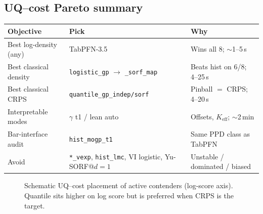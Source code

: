 \documentclass[11pt,a4paper]{article}
\theoremstyle{definition}
\newcommand{\Keff}{K_{\mathrm{eff}}}
\begin{document}
\subsection{UQ--cost Pareto summary}
\begin{center}
\renewcommand{\arraystretch}{1.12}
\small
\begin{tabular}{@{}p{3.4cm}p{4.2cm}p{4.6cm}@{}}
\toprule
Objective & Pick & Why \\
\midrule
Best log-density (any) & TabPFN-3.5 & Wins all 8; $\sim$1--5\,s \\
Best classical density & \texttt{logistic\_gp} $\to$ \texttt{\_sorf\_map} & Beats hist on 6/8; 4--25\,s \\
Best classical CRPS & \texttt{quantile\_gp\_indep/sorf} & Pinball $=$ CRPS; 4--20\,s \\
Interpretable modes & $\gamma$ t1 / lean auto & Offsets, $\Keff$; $\sim$2\,min \\
Bar-interface audit & \texttt{hist\_mogp\_t1} & Same PPD class as TabPFN \\
Avoid & \texttt{*\_vexp}, \texttt{hist\_lmc}, VI logistic, Yu-SORF@$d{=}1$ &
  Unstable / dominated / biased \\
\bottomrule
\end{tabular}
\end{center}

\begin{figure}[ht]
\centering
{}
\caption{Schematic UQ--cost placement of active contenders (log-score axis).
Quantile sits higher on log score but is preferred when CRPS is the target.}
\label{fig:pareto}
\end{figure}
\end{document}
